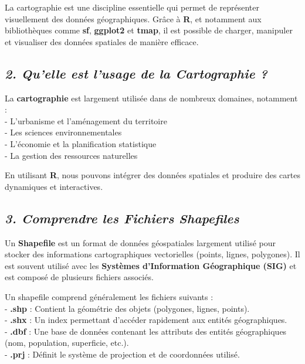 \documentclass[
]{article}
\begin{document}
La cartographie est une discipline essentielle qui permet de représenter
visuellement des données géographiques. Grâce à \textbf{R}, et notamment
aux bibliothèques comme \textbf{sf}, \textbf{ggplot2} et \textbf{tmap},
il est possible de charger, manipuler et visualiser des données
spatiales de manière efficace.

\subsection{\texorpdfstring{\emph{2. Qu'elle est l'usage de la
Cartographie
?}}{2. Qu'elle est l'usage de la Cartographie ?}}\label{quelle-est-lusage-de-la-cartographie}

La \textbf{cartographie} est largement utilisée dans de nombreux
domaines, notamment :\\
- L'urbanisme et l'aménagement du territoire\\
- Les sciences environnementales\\
- L'économie et la planification statistique\\
- La gestion des ressources naturelles

En utilisant \textbf{R}, nous pouvons intégrer des données spatiales et
produire des cartes dynamiques et interactives.

\subsection{\texorpdfstring{\emph{3. Comprendre les Fichiers
Shapefiles}}{3. Comprendre les Fichiers Shapefiles}}\label{comprendre-les-fichiers-shapefiles}

Un \textbf{Shapefile} est un format de données géospatiales largement
utilisé pour stocker des informations cartographiques vectorielles
(points, lignes, polygones). Il est souvent utilisé avec les
\textbf{Systèmes d'Information Géographique (SIG)} et est composé de
plusieurs fichiers associés.

Un shapefile comprend généralement les fichiers suivants :\\
- \textbf{.shp} : Contient la géométrie des objets (polygones, lignes,
points).\\
- \textbf{.shx} : Un index permettant d'accéder rapidement aux entités
géographiques.\\
- \textbf{.dbf} : Une base de données contenant les attributs des
entités géographiques (nom, population, superficie, etc.).\\
- \textbf{.prj} : Définit le système de projection et de coordonnées
utilisé.
\end{document}
